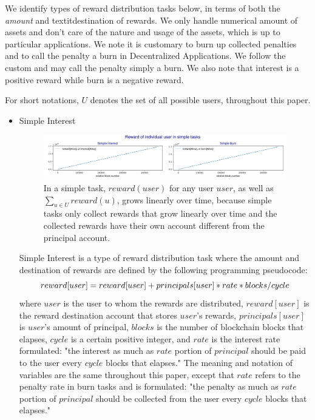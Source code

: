 \documentclass{article}
\begin{document}
We identify types of reward distribution tasks below, in terms of both the 
\textit{amount} and textit{destination} of rewards. We only handle numerical 
amount of assets and don't care of the nature and usage of the assets, 
which is up to particular applications.
We note it is customary to burn up collected penalties and to call the 
penalty a burn in Decentralized Applications.
We follow the custom and may call the penalty simply a burn.
We also note that interest is a positive reward while burn is a negative reward.

For short notations, $U$ denotes the set of all possible users,
throughout this paper.

\begin{itemize}
  \item Simple Interest

  \begin{figure}[H]
    \centering
    \includegraphics[width=5.3in]{images/_6.3_free_sim_individual_rewards.jpg}
    \caption{In a simple task, 
    $reward(user)$ for any user $user$, as well as $\sum_{u \in U}reward(u)$,
    grows linearly over time, because simple tasks only collect  
    rewards that grow linearly over time and the collected rewards 
    have their own account different from the principal account.
    }
    \label{fig:free_sim_individual_rewards}
  \end{figure} 

  \label{sec:SimpleInterest} 
  Simple Interest is a type of reward distribution task where the amount 
  and destination of rewards are defined by the following programming pseudocode:  
  \begin{equation} \label{eq:SimpleInterest}
    \\reward[user] = reward[user] + principals[user] *  rate  * blocks / cycle
    \end{equation}
    where $user$ is the user to whom the rewards are distributed, $reward[user]$ is the 
    reward destination account that stores $user$'s rewards, $principals[user]$ is 
    $user$'s amount of principal, $blocks$ is the number of blockchain 
    blocks that elapses, $cycle$ is a certain positive integer, 
    and $rate$ is the 
    interest rate formulated: "the interest as much as $rate$ portion of $principal$
    should be paid to the user every $cycle$ blocks that elapses." 
    The meaning and notation of variables 
    are the same throughout this paper, except that $rate$ refers to 
    the penalty rate in burn tasks and is formulated: 
    "the penalty as much as $rate$ portion of $principal$ should be collected from 
    the user every $cycle$ blocks that elapses."


\end{itemize}
\end{document}
